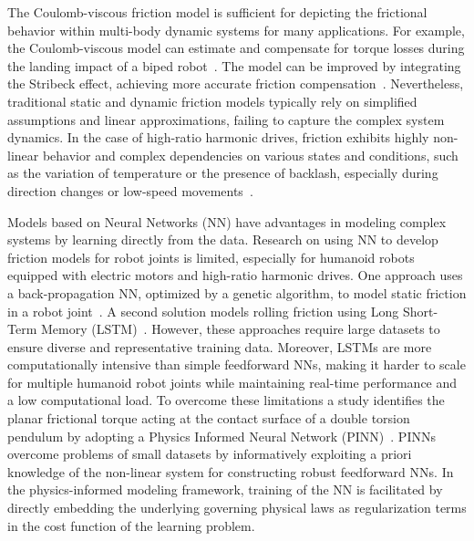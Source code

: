 The Coulomb-viscous friction model is sufficient for depicting the frictional behavior within multi-body dynamic systems for many applications. For example, the Coulomb-viscous model can estimate and compensate for torque losses during the landing impact of a biped robot~\cite{nagamatsu2017distributed}. The model can be improved by integrating the Stribeck effect, achieving more accurate friction compensation~\cite{jin2019joint}. Nevertheless, traditional static and dynamic friction models typically rely on simplified assumptions and linear approximations, failing to capture the complex system dynamics. In the case of high-ratio harmonic drives, friction exhibits highly non-linear behavior and complex dependencies on various states and conditions, such as the variation of temperature or the presence of backlash, especially during direction changes or low-speed movements~\cite{wolf2018extending}.


Models based on Neural Networks (NN) have advantages in modeling complex systems by learning directly from the data. Research on using NN to develop friction models for robot joints is limited, especially for humanoid robots equipped with electric motors and high-ratio harmonic drives. One approach uses a back-propagation NN, optimized by a genetic algorithm, to model static friction in a robot joint~\cite{tu2019modeling}. A second solution models rolling friction using Long Short-Term Memory (LSTM)~\cite{wang2023improved}. However, these approaches require large datasets to ensure diverse and representative training data. Moreover, LSTMs are more computationally intensive than simple feedforward NNs, making it harder to scale for multiple humanoid robot joints while maintaining real-time performance and a low computational load. To overcome these limitations a study identifies the planar frictional torque acting at the contact surface of a double torsion pendulum by adopting a Physics Informed Neural Network (PINN)~\cite{olejnik2023friction}. PINNs overcome problems of small datasets by informatively exploiting a priori knowledge of the non-linear system for constructing robust feedforward NNs. In the physics-informed modeling framework, training of the NN is facilitated by directly embedding the underlying governing physical laws as regularization terms in the cost function of the learning problem.

